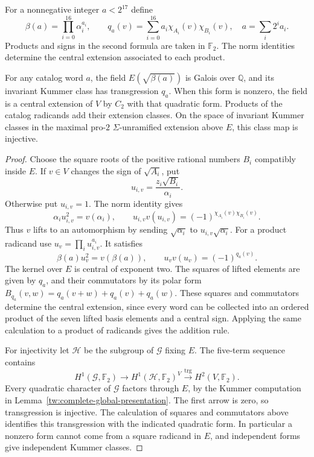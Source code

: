 For a nonnegative integer $a<2^{17}$ define
\[
 \beta(a)=\prod_{i=0}^{16}\alpha_i^{a_i},\qquad
 q_a(v)=\sum_{i=0}^{16}a_i\chi_{A_i}(v)\chi_{B_i}(v),
 \quad a=\sum_i2^ia_i.
\]
Products and signs in the second formula are taken in $\mathbb F_2$.
The norm identities determine the central extension associated to each
product.
\begin{lemma}\label{ar:kummer}
For any catalog word $a$, the field $E(\sqrt{\beta(a)})$ is Galois over
$\mathbb Q$, and its invariant Kummer class has transgression $q_a$. When this form
is nonzero, the field is a central extension of $V$ by $C_2$ with
that quadratic form. Products of the catalog radicands add their extension classes.
On the space of invariant Kummer classes in the maximal pro-$2$
$\Sigma$-unramified extension above $E$, this class map is injective.
\end{lemma}
\begin{proof}
Choose the square roots of the positive rational numbers $B_i$ compatibly
inside $E$. If $v\in V$ changes the sign of $\sqrt{A_i}$, put
\[
 u_{i,v}=\frac{z_i\sqrt{B_i}}{\alpha_i}.
\]
Otherwise put $u_{i,v}=1$. The norm identity gives
\[
 \alpha_i u_{i,v}^2=v(\alpha_i),\qquad
 u_{i,v}v(u_{i,v})=(-1)^{\chi_{A_i}(v)\chi_{B_i}(v)}.
\]
Thus $v$ lifts to an automorphism by sending
$\sqrt{\alpha_i}$ to $u_{i,v}\sqrt{\alpha_i}$. For a product radicand
use $u_v=\prod_i u_{i,v}^{a_i}$. It satisfies
\begin{equation}\label{ar:kummer-lifts}
 \beta(a)u_v^2=v(\beta(a)),\qquad
 u_vv(u_v)=(-1)^{q_a(v)}.
\end{equation}
The kernel over $E$ is central of exponent two. The squares of lifted
elements are given by $q_a$, and their commutators by its
polar form $B_{q_a}(v,w)=q_a(v+w)+q_a(v)+q_a(w)$. These squares and
commutators determine the central extension, since every word can be
collected into an ordered product of the seven lifted basis elements and
a central sign. Applying the same calculation to a product of radicands
gives the addition rule.

For injectivity let $\mathcal H$ be the subgroup of $\mathcal G$ fixing
$E$. The five-term sequence contains
\[
 H^1(\mathcal G,\mathbb F_2)\longrightarrow
 H^1(\mathcal H,\mathbb F_2)^V
 \xrightarrow{\mathrm{trg}} H^2(V,\mathbb F_2).
\]
Every quadratic character of $\mathcal G$ factors through $E$, by the
Kummer computation in Lemma~\ref{tw:complete-global-presentation}.
The first arrow is zero, so transgression is injective.
The calculation of squares and commutators above identifies this
transgression with the indicated quadratic form. In particular a
nonzero form cannot come from a square radicand in $E$, and independent
forms give independent Kummer classes.
\end{proof}

